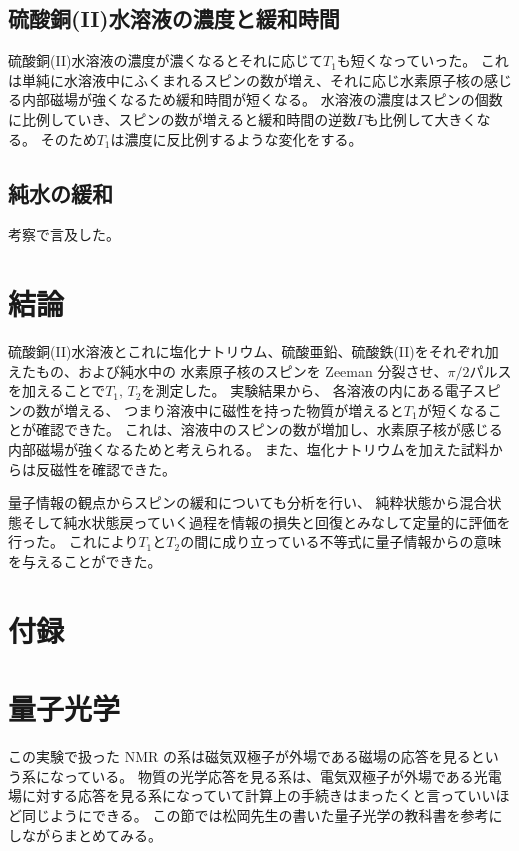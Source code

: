 \documentclass[11pt,dvipdfmx,a4paper]{jsarticle}
\begin{document}
\subsection{硫酸銅(II)水溶液の濃度と緩和時間}
硫酸銅(II)水溶液の濃度が濃くなるとそれに応じて\(T_1\)も短くなっていった。
これは単純に水溶液中にふくまれるスピンの数が増え、それに応じ水素原子核の感じる内部磁場が強くなるため緩和時間が短くなる。
水溶液の濃度はスピンの個数に比例していき、スピンの数が増えると緩和時間の逆数\(\Gamma\)も比例して大きくなる。
そのため\(T_1\)は濃度に反比例するような変化をする。

\subsection{純水の緩和}
考察で言及した。

\section{結論}
硫酸銅(II)水溶液とこれに塩化ナトリウム、硫酸亜鉛、硫酸鉄(II)をそれぞれ加えたもの、および純水中の
水素原子核のスピンを Zeeman 分裂させ、\(\pi/2\)パルスを加えることで\(T_1,\,T_2\)を測定した。
実験結果から、
各溶液の内にある電子スピンの数が増える、
つまり溶液中に磁性を持った物質が増えると\(T_1\)が短くなることが確認できた。
これは、溶液中のスピンの数が増加し、水素原子核が感じる内部磁場が強くなるためと考えられる。
また、塩化ナトリウムを加えた試料からは反磁性を確認できた。

量子情報の観点からスピンの緩和についても分析を行い、
純粋状態から混合状態そして純水状態戻っていく過程を情報の損失と回復とみなして定量的に評価を行った。
これにより\(T_1\)と\(T_2\)の間に成り立っている不等式に量子情報からの意味を与えることができた。




\section*{付録}


\section{量子光学}
この実験で扱った NMR の系は磁気双極子が外場である磁場の応答を見るという系になっている。
物質の光学応答を見る系は、電気双極子が外場である光電場に対する応答を見る系になっていて計算上の手続きはまったくと言っていいほど同じようにできる。
この節では松岡先生の書いた量子光学の教科書\cite{Matsuoka_2000}を参考にしながらまとめてみる。
\end{document}

